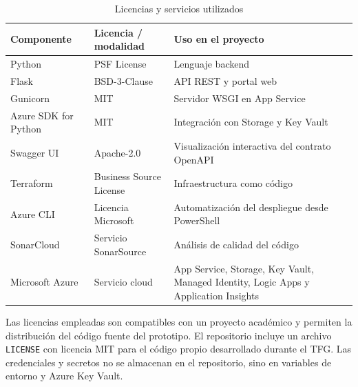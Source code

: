 \begin{table}[h]
\centering
\small
\begin{tabularx}{\textwidth}{l l X}
\textbf{Componente} & \textbf{Licencia / modalidad} & \textbf{Uso en el proyecto} \\
\hline
Python & PSF License & Lenguaje backend \\
Flask & BSD-3-Clause & API REST y portal web \\
Gunicorn & MIT & Servidor WSGI en App Service \\
Azure SDK for Python & MIT & Integración con Storage y Key Vault \\
Swagger UI & Apache-2.0 & Visualización interactiva del contrato OpenAPI \\
Terraform & Business Source License & Infraestructura como código \\
Azure CLI & Licencia Microsoft & Automatización del despliegue desde PowerShell \\
SonarCloud & Servicio SonarSource & Análisis de calidad del código \\
Microsoft Azure & Servicio cloud & App Service, Storage, Key Vault, Managed Identity, Logic Apps y Application Insights \\
\end{tabularx}
\caption{Licencias y servicios utilizados}
\end{table}

Las licencias empleadas son compatibles con un proyecto académico y permiten la distribución del código fuente del prototipo. El repositorio incluye un archivo \texttt{LICENSE} con licencia MIT para el código propio desarrollado durante el TFG. Las credenciales y secretos no se almacenan en el repositorio, sino en variables de entorno y Azure Key Vault.
